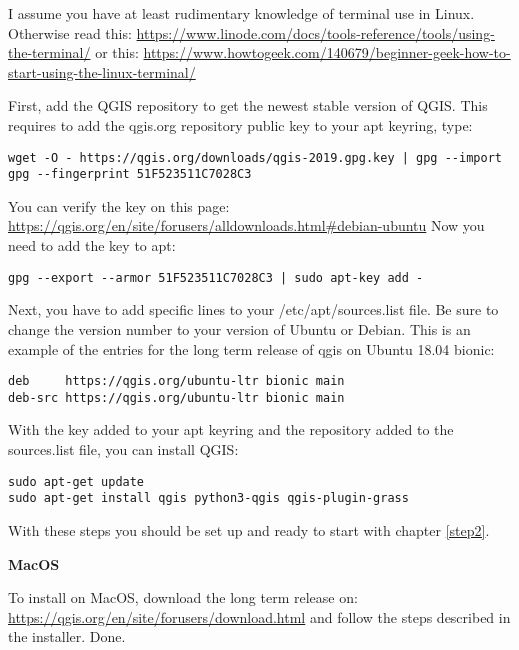 \documentclass[12pt,a4paper]{scrartcl}
\begin{document}
I assume you have at least rudimentary knowledge of terminal use in Linux. \newline
Otherwise read this: 
\url{https://www.linode.com/docs/tools-reference/tools/using-the-terminal/} \newline
or this: 
\url{https://www.howtogeek.com/140679/beginner-geek-how-to-start-using-the-linux-terminal/} \newline

First, add the QGIS repository to get the newest stable version of QGIS.
This requires to add the qgis.org repository public key to your apt keyring, type:

\begin{verbatim}
wget -O - https://qgis.org/downloads/qgis-2019.gpg.key | gpg --import
gpg --fingerprint 51F523511C7028C3
\end{verbatim}

You can verify the key on this page: \url{https://qgis.org/en/site/forusers/alldownloads.html\#debian-ubuntu}
Now you need to add the key to apt:  

\begin{verbatim}
gpg --export --armor 51F523511C7028C3 | sudo apt-key add -
\end{verbatim}

Next, you have to add specific lines to your /etc/apt/sources.list file.
Be sure to change the version number to your version of Ubuntu or Debian. \newline
This is an example of the entries for the long term release of qgis on Ubuntu 18.04 bionic:

\begin{verbatim}
deb     https://qgis.org/ubuntu-ltr bionic main
deb-src https://qgis.org/ubuntu-ltr bionic main
\end{verbatim}


With the key added to your apt keyring and the repository added to the sources.list file, you can install QGIS:  

\begin{verbatim}
sudo apt-get update
sudo apt-get install qgis python3-qgis qgis-plugin-grass
\end{verbatim}

With these steps you should be set up and ready to start with chapter \ref{step2}. \newline

\textbf{MacOS} \newline

To install on MacOS, download the long term release on:
\url{https://qgis.org/en/site/forusers/download.html} and follow the steps described in the installer. Done.\newline
\end{document}

